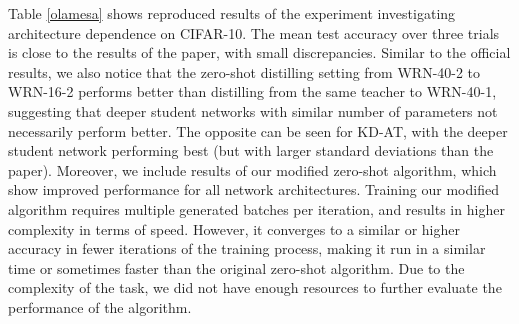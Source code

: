 Table \ref{olamesa} shows reproduced results of the experiment investigating architecture dependence on CIFAR-10. The mean test accuracy over three trials is close to the results of the paper, with small discrepancies. Similar to the official results, we also notice that the zero-shot distilling setting from WRN-40-2 to WRN-16-2 performs better than distilling from the same teacher to WRN-40-1, suggesting that deeper student networks with similar number of parameters not necessarily perform better. The opposite can be seen for KD-AT, with the deeper student network performing best (but with larger standard deviations than the paper). Moreover, we include results of our modified zero-shot algorithm, which show improved performance for all network architectures. Training our modified algorithm requires multiple generated batches per iteration, and results in higher complexity in terms of speed. However, it converges to a similar or higher accuracy in fewer iterations of the training process, making it run in a similar time or sometimes faster than the original zero-shot algorithm. Due to the complexity of the task, we did not have enough resources to further evaluate the performance of the algorithm. 

